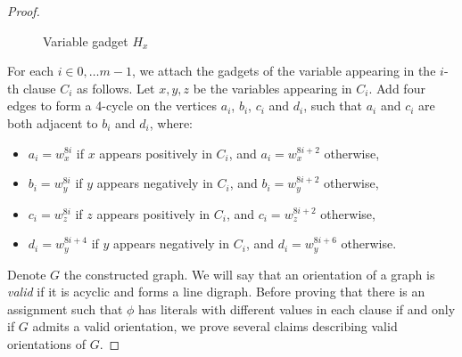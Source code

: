 \documentclass[11pt,a4aper]{article}
\begin{document}
\begin{proof}
\begin{figure}[h!]
    \caption{Variable gadget $H_x$}
    \label{fig:variable_gadget}    
  \end{figure}
  
  For each $i \in {0, \dots m-1}$, we attach the gadgets of the variable
  appearing in the $i$-th clause $C_i$ as follows. Let $x, y, z$ be the variables
  appearing in $C_i$. Add four edges to form a 4-cycle on the vertices $a_i$,
  $b_i$, $c_i$ and $d_i$, such that $a_i$ and $c_i$ are both adjacent to $b_i$ and $d_i$, where:
  \begin{itemize}
  \item $a_i=w_x^{8i}$ if $x$ appears positively in $C_i$, and $a_i=w_x^{8i+2}$ otherwise,
  \item $b_i=w_y^{8i}$ if $y$ appears negatively in $C_i$, and $b_i=w_y^{8i+2}$ otherwise,
  \item $c_i=w_z^{8i}$ if $z$ appears positively in $C_i$, and $c_i=w_z^{8i+2}$
    otherwise,
  \item $d_i=w_y^{8i+4}$ if $y$ appears negatively in $C_i$, and $d_i=w_y^{8i+6}$ otherwise.
  \end{itemize}

  Denote $G$ the constructed graph. We will say that an orientation of a graph
  is \emph{valid} if it is acyclic and forms a line digraph. Before proving that
  there is an assignment such that $\phi$ has literals with different values in
  each clause if and only if $G$ admits a valid orientation, we prove several
  claims describing valid orientations of $G$.


\end{proof}
\end{document}
